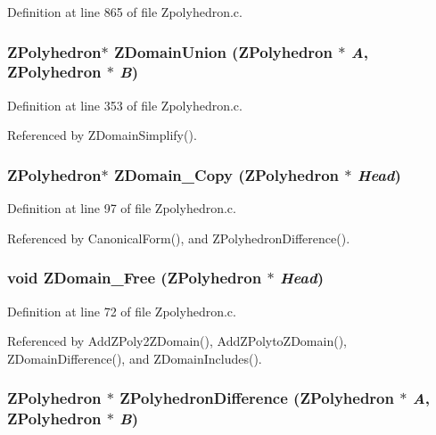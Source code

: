 Definition at line 865 of file Zpolyhedron.c.
\subsubsection{\setlength{\rightskip}{0pt plus 5cm}ZPolyhedron$\ast$ ZDomain\-Union (ZPolyhedron $\ast$ {\em A}, ZPolyhedron $\ast$ {\em B})}\label{Zpolyhedron_8c_a18}




Definition at line 353 of file Zpolyhedron.c.

Referenced by ZDomain\-Simplify().

\subsubsection{\setlength{\rightskip}{0pt plus 5cm}ZPolyhedron$\ast$ ZDomain\_\-Copy (ZPolyhedron $\ast$ {\em Head})}\label{Zpolyhedron_8c_a12}




Definition at line 97 of file Zpolyhedron.c.

Referenced by Canonical\-Form(), and ZPolyhedron\-Difference().

\subsubsection{\setlength{\rightskip}{0pt plus 5cm}void ZDomain\_\-Free (ZPolyhedron $\ast$ {\em Head})}\label{Zpolyhedron_8c_a11}




Definition at line 72 of file Zpolyhedron.c.

Referenced by Add\-ZPoly2ZDomain(), Add\-ZPolyto\-ZDomain(), ZDomain\-Difference(), and ZDomain\-Includes().

\subsubsection{\setlength{\rightskip}{0pt plus 5cm}ZPolyhedron $\ast$ ZPolyhedron\-Difference (ZPolyhedron $\ast$ {\em A}, ZPolyhedron $\ast$ {\em B})\hspace{0.3cm}{\tt  [static]}}\label{Zpolyhedron_8c_a4}




